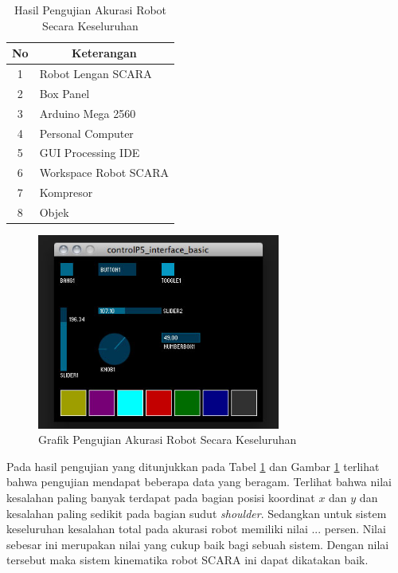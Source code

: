 \begin{table}[H]
	\centering
	\caption{Hasil Pengujian Akurasi Robot Secara Keseluruhan}
	\label{tbl.akurasikeseluruhan}
	\begin{tabular}{|c|l|}
		\hline
		\rowcolor[HTML]{9B9B9B} 
		
		No & \multicolumn{1}{c|}{\cellcolor[HTML]{9B9B9B}Keterangan} \\ \hline
		1  & Robot Lengan SCARA                                      \\ \hline
		2  & Box Panel                                               \\ \hline
		3  & Arduino Mega 2560                                       \\ \hline
		4  & Personal Computer                                       \\ \hline
		5  & GUI Processing IDE                                      \\ \hline
		6  & Workspace Robot SCARA                                   \\ \hline
		7  & Kompresor                                               \\ \hline
		8  & Objek                                                   \\ \hline
	\end{tabular}
	
\end{table} 
\begin{figure}[H]
	\centering
	\includegraphics[width=8cm]{gambar/controlp5.jpg}
	\caption{Grafik Pengujian Akurasi Robot Secara Keseluruhan}
	\label{pic.akurasikeseluruhan}
\end{figure}

Pada hasil pengujian yang ditunjukkan pada Tabel \ref{tbl.akurasikeseluruhan} dan Gambar \ref{pic.akurasikeseluruhan} terlihat bahwa pengujian mendapat beberapa data yang beragam. Terlihat bahwa nilai kesalahan paling banyak terdapat pada bagian posisi koordinat $x$ dan $y$ dan kesalahan paling sedikit pada bagian sudut \textit{shoulder}. Sedangkan untuk sistem keseluruhan kesalahan total pada akurasi robot memiliki nilai ... persen. Nilai sebesar ini merupakan nilai yang cukup baik bagi sebuah sistem. Dengan nilai tersebut maka sistem kinematika robot SCARA ini dapat dikatakan baik. 
